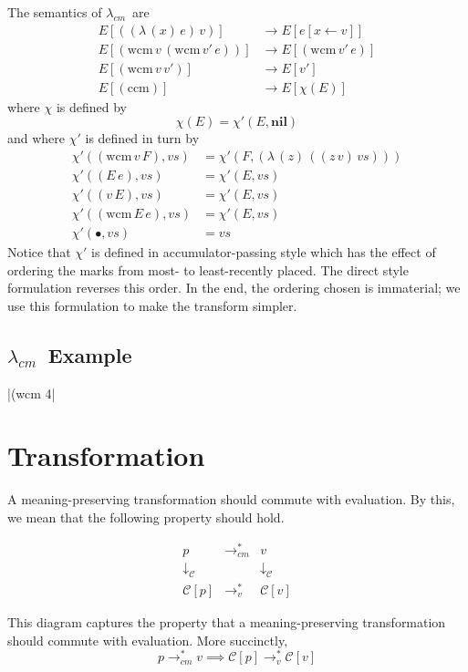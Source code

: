 \documentclass{llncs}
\newcommand{\cm}[0]{$\lambda_{cm}$}
\newcommand{\wcm}[2]{(\mathrm{wcm}\,#1\,#2)}
\newcommand{\ccm}[0]{(\mathrm{ccm})}
\newcommand{\app}[2]{(#1\,#2)}
\newcommand{\abs}[2]{(\lambda\,(#1)\,#2)}
\newcommand{\hole}[0]{\bullet}
\newcommand{\rr}[0]{\rightarrow}
\newcommand{\lvrrs}[0]{\rightarrow_v^{*}}
\newcommand{\cmrrs}[0]{\rightarrow_{cm}^{*}}
\newcommand{\C}[1]{\mathcal{C}[#1]}
\begin{document}
The semantics of \cm\ are
\begin{align}
E[\app{\abs{x}{e}}{v}]  &\rr E[e[x\leftarrow v]]\\
E[\wcm{v}{\wcm{v'}{e}}] &\rr E[\wcm{v'}{e}]\\
E[\wcm{v}{v'}]          &\rr E[v']\\
E[\ccm]                 &\rr E[\chi(E)]
\end{align}
where $\chi$ is defined by
\begin{equation}
\chi(E)=\chi'(E,\mathbf{nil})
\end{equation}
and where $\chi'$ is defined in turn by
\begin{align}
\chi'(\wcm{v}{F},vs) &= \chi'(F,\abs{z}{\app{\app{z}{v}}{vs}})\\
\chi'(\app{E}{e},vs) &= \chi'(E,vs)\\
\chi'(\app{v}{E},vs) &= \chi'(E,vs)\\
\chi'(\wcm{E}{e},vs) &= \chi'(E,vs)\\
\chi'(\hole,vs)      &= vs
\end{align}
Notice that $\chi'$ is defined in accumulator-passing style which has the effect of ordering the marks from most- to least-recently placed. The direct style formulation reverses this order. In the end, the ordering chosen is immaterial; we use this formulation to make the transform simpler.

\subsection{\cm\ Example}

\scheme|(wcm 4|

\section{Transformation}

A meaning-preserving transformation should commute with evaluation. By this, we mean that the following property should hold.

\[
\begin{array}{ccc}
p & \cmrrs & v\\
\downarrow_\mathcal{C} & & \downarrow_\mathcal{C}\\
\C{p} & \lvrrs & \C{v}
\end{array}
\]

This diagram captures the property that a meaning-preserving transformation should commute with evaluation. More succinctly, 
\begin{equation}
\label{meaning-preservation-property}
p\cmrrs v\implies\C{p}\lvrrs\C{v}
\end{equation}
\end{document}
